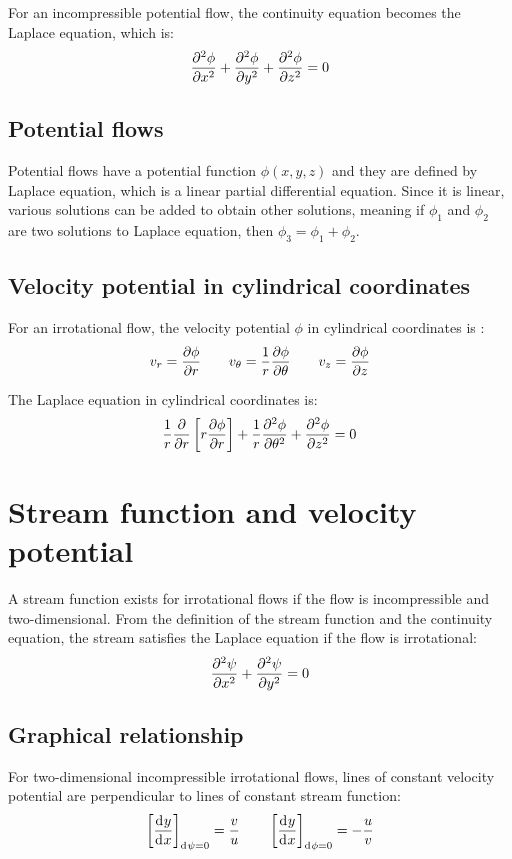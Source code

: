 \documentclass[10pt, twocolumn]{article}
\begin{document}
For an incompressible potential flow, the continuity equation becomes the Laplace equation, which is:
\[
  \frac{\partial^{2} \phi}{\partial x^{2}} + \frac{\partial^{2} \phi}{\partial y^{2}} + \frac{\partial^{2} \phi}{\partial z^{2}} = 0
\]


\subsection{Potential flows}
Potential flows have a potential function \(\phi(x,y,z)\) and they are defined by Laplace equation, which is a linear partial differential equation.
Since it is linear, various solutions can be added to obtain other solutions, meaning if \(\phi_1\) and \(\phi_2\) are two solutions to Laplace equation, then \(\phi_3 = \phi_1 + \phi_2\).


\subsection{Velocity potential in cylindrical coordinates}
For an irrotational flow, the velocity potential \(\phi\) in cylindrical coordinates is :
\[
  v_r = \frac{\partial \phi}{\partial r} \qquad v_\theta = \frac{1}{r} \frac{\partial \phi}{\partial \theta} \qquad v_z = \frac{\partial \phi}{\partial z}
\]

The Laplace equation in cylindrical coordinates is:
\[
  \frac{1}{r} \frac{\partial }{\partial r} \left[ r \frac{\partial \phi}{\partial r} \right] + \frac{1}{r} \frac{\partial^{2} \phi}{\partial \theta^{2}} + \frac{\partial^{2} \phi}{\partial z^{2}} = 0
\]


\section{Stream function and velocity potential}
A stream function exists for irrotational flows if the flow is incompressible and two-dimensional.
From the definition of the stream function and the continuity equation, the stream satisfies the Laplace equation if the flow is irrotational:
\[
  \frac{\partial^{2} \psi}{\partial x^{2}} + \frac{\partial^{2} \psi}{\partial y^{2}} = 0
\]


\subsection{Graphical relationship}
For two-dimensional incompressible irrotational flows, lines of constant velocity potential are perpendicular to lines of constant stream function:
\[
  \left[ \frac{\mathrm{d}^{} y}{\mathrm{d}^{} x} \right]_{\mathrm{d}^{} \psi = 0} = \frac{v}{u} \qquad \left[ \frac{\mathrm{d}^{} y}{\mathrm{d}^{} x} \right]_{\mathrm{d}^{} \phi = 0} = - \frac{u}{v}
\]
\end{document}
